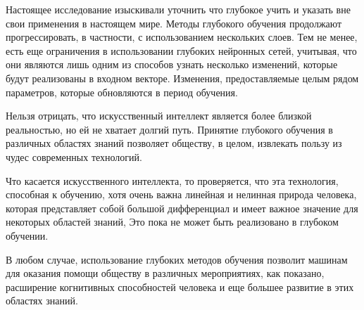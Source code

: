 Настоящее исследование изыскивали уточнить что глубокое учить и указать вне свои применения в настоящем мире.
Методы глубокого обучения продолжают прогрессировать, в частности, с использованием нескольких слоев.
Тем не менее, есть еще ограничения в использовании глубоких нейронных сетей, учитывая,
что они являются лишь одним из способов узнать несколько изменений, которые будут реализованы в входном векторе.
Изменения, предоставляемые целым рядом параметров, которые обновляются в период обучения.

Нельзя отрицать, что искусственный интеллект является более близкой реальностью, но ей не хватает долгий путь.
Принятие глубокого обучения в различных областях знаний позволяет обществу, в целом, извлекать пользу из чудес современных технологий.

Что касается искусственного интеллекта, то проверяется, что эта технология, способная к обучению, хотя очень важна линейная и нелинная природа человека,
которая представляет собой большой дифференциал и имеет важное значение для некоторых областей знаний, Это пока не может быть реализовано в глубоком обучении.

В любом случае, использование глубоких методов обучения позволит машинам для оказания помощи обществу в различных мероприятиях,
как показано, расширение когнитивных способностей человека и еще большее развитие в этих областях знаний.

